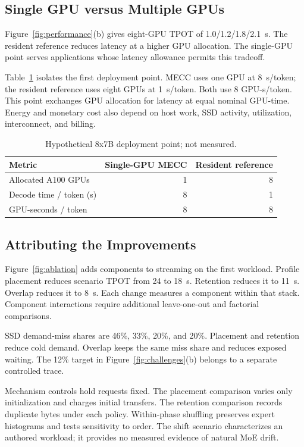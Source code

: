 \documentclass[conference,9pt,letterpaper]{IEEEtran}
\newcommand{\mecc}{\textsc{MECC}}
\begin{document}
\subsection{Single GPU versus Multiple GPUs}
Figure~\ref{fig:performance}(b) gives eight-GPU TPOT of 1.0/1.2/1.8/2.1~s. The resident reference reduces latency at a higher GPU allocation. The single-GPU point serves applications whose latency allowance permits this tradeoff.

Table~\ref{tab:gpu} isolates the first deployment point. \mecc{} uses one GPU at 8~s/token; the resident reference uses eight GPUs at 1~s/token. Both use 8 GPU-s/token. This point exchanges GPU allocation for latency at equal nominal GPU-time. Energy and monetary cost also depend on host work, SSD activity, utilization, interconnect, and billing.

\begin{table}[t]
\caption{Hypothetical 8x7B deployment point; not measured.}
\label{tab:gpu}\centering
\begin{tabular}{lrr}\toprule
Metric & Single-GPU \mecc{} & Resident reference\\\midrule
Allocated A100 GPUs & 1 & 8\\
Decode time / token (s) & 8 & 1\\
GPU-seconds / token & 8 & 8\\\bottomrule
\end{tabular}
\end{table}

\subsection{Attributing the Improvements}
Figure~\ref{fig:ablation} adds components to streaming on the first workload. Profile placement reduces scenario TPOT from 24 to 18~s. Retention reduces it to 11~s. Overlap reduces it to 8~s. Each change measures a component within that stack. Component interactions require additional leave-one-out and factorial comparisons.

SSD demand-miss shares are 46\%, 33\%, 20\%, and 20\%. Placement and retention reduce cold demand. Overlap keeps the same miss share and reduces exposed waiting. The 12\% target in Figure~\ref{fig:challenges}(b) belongs to a separate controlled trace.

Mechanism controls hold requests fixed. The placement comparison varies only initialization and charges initial transfers. The retention comparison records duplicate bytes under each policy. Within-phase shuffling preserves expert histograms and tests sensitivity to order. The shift scenario characterizes an authored workload; it provides no measured evidence of natural MoE drift.
\end{document}
